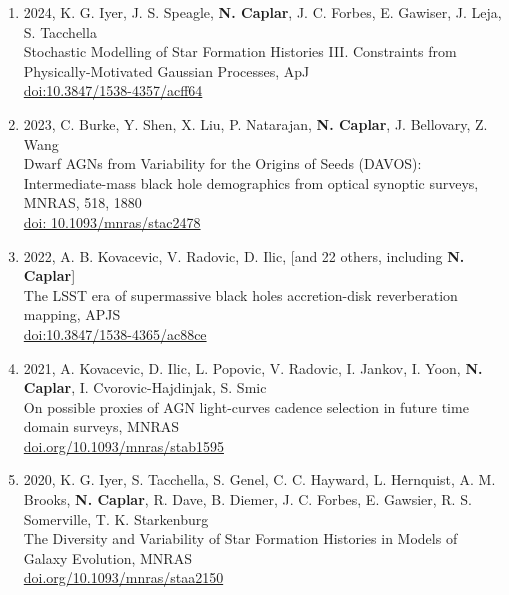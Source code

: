 \documentclass[11pt,letterpaper]{article}
\begin{document}
\begin{enumerate}
\item 2024, K. G. Iyer, J. S. Speagle, \textbf{N. Caplar}, J. C. Forbes, E. Gawiser, J. Leja, S. Tacchella   \\
Stochastic Modelling of Star Formation Histories III. Constraints from Physically-Motivated Gaussian Processes,  ApJ\\
\href{https://ui.adsabs.harvard.edu/link_gateway/2024ApJ...961...53I/doi:10.3847/1538-4357/acff64}{doi:10.3847/1538-4357/acff64} \\

\item 2023, C. Burke, Y. Shen, X. Liu, P. Natarajan, \textbf{N. Caplar}, J. Bellovary, Z. Wang   \\
Dwarf AGNs from Variability for the Origins of Seeds (DAVOS): Intermediate-mass black hole demographics from optical synoptic surveys, MNRAS, 518, 1880 \\
\href{https://ui.adsabs.harvard.edu/link_gateway/2022MNRAS.tmp.2505B/doi:10.1093/mnras/stac2478}{doi: 
10.1093/mnras/stac2478} \\


\item 2022, A. B. Kovacevic, V. Radovic, D. Ilic, [and 22 others, including \textbf{N. Caplar}] \\
The LSST era of supermassive black holes accretion-disk reverberation mapping, APJS \\
\href{https://ui.adsabs.harvard.edu/link_gateway/2022ApJS..262...49K/doi:10.3847/1538-4365/ac88ce}{doi:10.3847/1538-4365/ac88ce} \\






\item 2021, A. Kovacevic, D. Ilic, L. Popovic, V. Radovic, I. Jankov, I. Yoon,  \textbf{N. Caplar}, I. Cvorovic-Hajdinjak, S. Smic   \\
On possible proxies of AGN light-curves cadence selection in future time domain surveys,  MNRAS\\
\href{https://doi.org/10.1093/mnras/stab1595}{doi.org/10.1093/mnras/stab1595} \\

\item 2020, K. G. Iyer, S. Tacchella, S. Genel, C. C. Hayward, L. Hernquist, A. M. Brooks,  \textbf{N. Caplar}, R. Dave, B. Diemer, J. C. Forbes, E. Gawsier, R. S. Somerville, T. K. Starkenburg   \\
The Diversity and Variability of Star Formation Histories in Models of Galaxy Evolution,  MNRAS\\
\href{https://doi.org/10.1093/mnras/staa2150}{doi.org/10.1093/mnras/staa2150}\\


\end{enumerate}
\end{document}
